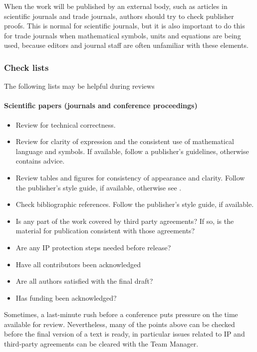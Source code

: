 When the work will be published by an external body, such as articles in scientific journals and trade journals, authors should try to check publisher proofs. This is normal for scientific journals, but it is also important to do this for trade journals when mathematical symbols, units and equations are being used, because editors and journal staff are often unfamiliar with these elements.  

\subsubsection{Check lists}
The following lists may be helpful during reviews
\paragraph{Scientific papers (journals and conference proceedings)}
\begin{itemize}
\item  Review for technical correctness.
\item  Review for clarity of expression and the consistent use of mathematical language and symbols.  If available, follow a publisher’s guidelines, otherwise \cite[\S\ref*{GRP-s:scientific_documents}]{MSL_Reporting_Guidelines} contains advice.
\item  Review tables and figures for consistency of appearance and clarity. Follow the publisher’s style guide, if available, otherwise see \cite[\S\ref*{GRP-s:scientific_documents}]{MSL_Reporting_Guidelines}.
\item  Check bibliographic references. Follow the publisher’s style guide, if available.
\item  Is any part of the work covered by third party agreements? If so, is the material for publication consistent with those agreements? 
\item  Are any IP protection steps needed before release?
\item  Have all contributors been acknowledged
\item  Are all authors satisfied with the final draft?
\item  Has funding been acknowledged?
\end{itemize}

Sometimes, a last-minute rush before a conference puts pressure on the time available for review. Nevertheless, many of the points above can be checked before the final version of a text is ready, in particular issues related to IP and third-party agreements can be cleared with the Team Manager.

